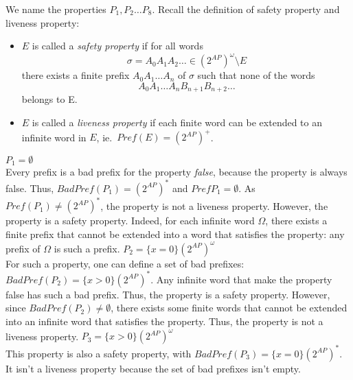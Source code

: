 \documentclass[11pt,a4paper]{article}
\newcommand\badp{\mathit{BadPref}}
\newcommand\pref{\mathit{Pref}}
\newcommand\twoap{2^{AP}}
\renewcommand\star{^*}
\begin{document}
\begin{Answer}


We name the properties $P_1, P_2\dots P_8$.
Recall the definition of safety property and liveness property:
\begin{itemize}
	\item $E$ is called a \emph{safety property} if for all words
		$$\sigma = A_0A_1A_2\dots\in{(\twoap)}^\omega\setminus E$$
		there exists a finite prefix $A_0A_1\dots A_n$ of $\sigma$ such that none of the words $$A_0A_1\dots A_nB_{n+1}B_{n+2}\dots$$ belongs to E. %
	\item $E$ is called a \emph{liveness property} if each finite word can be extended to an infinite word in $E$, ie.\ $\pref(E) = {(\twoap)}^+$.
\end{itemize}
  \Question%
  $P_1 = \emptyset$\\
Every prefix is a bad prefix for the property \textit{false}, because the property is always false. Thus, $\badp(P_1) = (\twoap)\star$ and $\pref{P_1} = \emptyset$. As $\pref(P_1)\neq (\twoap)\star$, the property is not a liveness property. However, the property is a safety property. Indeed, for each infinite word $\Omega$, there exists a finite prefix that cannot be extended into a word that satisfies the property: any prefix of $\Omega$ is such a prefix. %
  \Question%
  $P_2 = \{x = 0\}(\twoap)^\omega$\\
For such a property, one can define a set of bad prefixes: $\badp(P_2) = \{x > 0\}(\twoap)\star$. Any infinite word that make the property false has such a bad prefix. Thus, the property is a safety property. However, since $\badp(P_2)\neq\emptyset$, there exists some finite words that cannot be extended into an infinite word that satisfies the property. Thus, the property is not a liveness property.
  \Question%
  $P_3 =  \{x > 0\}(\twoap)^\omega$\\
This property is also a safety property, with $\badp(P_3) = \{x=0\}(\twoap)\star$. It isn't a liveness property because the set of bad prefixes isn't empty.

\end{Answer}
\end{document}
